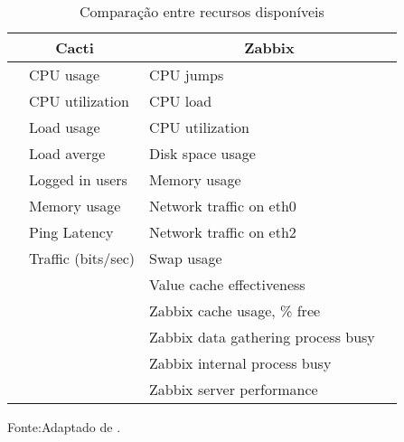 \begin{table}[!ht]
	\caption{Comparação entre recursos disponíveis}
	\begin{center}
		\begin{tabular}{ll|ll}
			\hline
			\multicolumn{2}{c}{Cacti}       & \multicolumn{2}{|c}{Zabbix}                   \\ \hline
			& CPU usage                     & CPU jumps                                  &  \\ \hline
			& CPU utilization               & CPU load                                   &  \\ \hline
			& Load usage                    & CPU utilization                            &  \\ \hline
			& Load averge                   & Disk space usage                           &  \\ \hline
			& Logged in users               & Memory usage                               &  \\ \hline
			& Memory usage                  & Network traffic on eth0                    &  \\ \hline
			& Ping Latency                  & Network traffic on eth2                    &  \\ \hline
			& Traffic (bits/sec)            & Swap usage                                 &  \\ \hline
			&                               & Value cache effectiveness                  &  \\ \hline
			&                               & Zabbix cache usage, \% free                &  \\ \hline
			&                               & Zabbix data gathering process busy         &  \\ \hline
			&                               & Zabbix internal process busy               &  \\ \hline
			&                               & Zabbix server performance                  &  \\ \hline
		\end{tabular}
	\end{center}
	\small{Fonte:Adaptado de \cite{dos2016comparativo}.}
	\label{tabrecursosdisp1}
\end{table}

